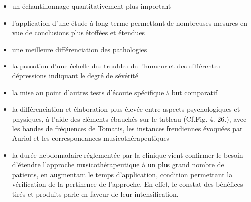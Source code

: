 \begin{itemize}

\item un échantillonnage quantitativement plus important

\item  l'application d'une étude à long terme permettant de nombreuses
  mesures en vue de conclusions plus étoffées et étendues

   \item  une meilleure différenciation des pathologies
   \item la passation d'une échelle des troubles de l'humeur et des différentes
       dépressions indiquant le degré de sévérité
     \item la mise au point  d'autres tests d'écoute spécifique à but
       comparatif
     \item la différenciation et élaboration plus élevée entre aspects
       psychologiques et physiques, à l'aide des éléments ébauchés sur
       le tableau (Cf.Fig. 4. 26.), avec les bandes de fréquences de
       Tomatis, les instances freudiennes évoquées par Auriol et
       les correspondances musicothérapeutiques








     \item la durée hebdomadaire réglementée par la clinique vient
       confirmer le besoin d'étendre l'approche musicothérapeutique à
       un plus grand nombre de patients, en augmentant le temps
       d'application, condition permettant la vérification de la
       pertinence de l'approche. En effet, le constat des bénéfices
       tirés et
       produits parle en faveur de leur intensification.




\end{itemize}
